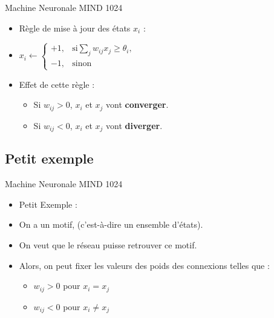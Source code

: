 \documentclass{beamer}
\begin{document}
\begin{frame}{Machine Neuronale MIND 1024}
    \begin{itemize}[<+-| alert@+>] %
        \item Règle de mise à jour des états $x_i$ :
        \item $
                x_i \leftarrow
                \begin{cases}
                +1,& \text{si} \sum_j w_{ij} x_j \geq \theta_i,\\
                -1,& \text{sinon}
                \end{cases}
              $
        \item Effet de cette règle :
            \begin{itemize}[<+-| alert@+>] %
                \item Si $w_{ij} > 0$, $x_i$ et $x_j$ vont \textbf{converger}.
                \item Si $w_{ij} < 0$, $x_i$ et $x_j$ vont \textbf{diverger}.
            \end{itemize}
    \end{itemize}
\end{frame}

\subsection{Petit exemple}

\begin{frame}{Machine Neuronale MIND 1024}
    \begin{itemize}[<+-| alert@+>] %
        \item Petit Exemple :
        \item On a un motif, (c'est-à-dire un ensemble d'états).
        \item On veut que le réseau puisse retrouver ce motif.
        \item Alors, on peut fixer les valeurs des poids des connexions telles que :
        \begin{itemize}[<+-| alert@+>] %
            \item $w_{ij} > 0$ pour $x_i = x_j$
            \item $w_{ij} < 0$ pour $x_i \neq x_j$
        \end{itemize}
    \end{itemize}
\end{frame}
\end{document}
